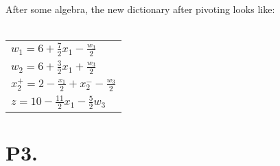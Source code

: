 \documentclass[12pt]{article}
\begin{document}
After some algebra, the new dictionary after pivoting looks like:\\
\\
\begin{tabular}{l}
  $w_{1} = 6 + \frac{7}{2}x_{1} - \frac{w_{3}}{2}$\\[.5em]
  $w_{2} = 6 + \frac{3}{2}x_{1} + \frac{w_{3}}{2}$\\[.5em]
  $x^{+}_{2} = 2 - \frac{x_{1}}{2} + x^{-}_{2} - \frac{w_{3}}{2}$\\[.5em]
  \hline
  $z = 10 - \frac{11}{2}x_{1} - \frac{5}{2}w_{3}$\\
\end{tabular}
\newpage

\section*{P3.}
\end{document}
